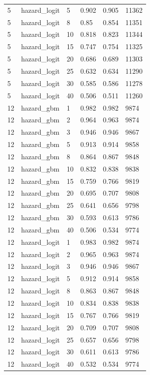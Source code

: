 \begin{tabular}{llllll}
5 & hazard\_logit & 5 & 0.902 & 0.905 & 11362 \\
5 & hazard\_logit & 8 & 0.85 & 0.854 & 11351 \\
5 & hazard\_logit & 10 & 0.818 & 0.823 & 11344 \\
5 & hazard\_logit & 15 & 0.747 & 0.754 & 11325 \\
5 & hazard\_logit & 20 & 0.686 & 0.689 & 11303 \\
5 & hazard\_logit & 25 & 0.632 & 0.634 & 11290 \\
5 & hazard\_logit & 30 & 0.585 & 0.586 & 11278 \\
5 & hazard\_logit & 40 & 0.506 & 0.511 & 11260 \\
12 & hazard\_gbm & 1 & 0.982 & 0.982 & 9874 \\
12 & hazard\_gbm & 2 & 0.964 & 0.963 & 9874 \\
12 & hazard\_gbm & 3 & 0.946 & 0.946 & 9867 \\
12 & hazard\_gbm & 5 & 0.913 & 0.914 & 9858 \\
12 & hazard\_gbm & 8 & 0.864 & 0.867 & 9848 \\
12 & hazard\_gbm & 10 & 0.832 & 0.838 & 9838 \\
12 & hazard\_gbm & 15 & 0.759 & 0.766 & 9819 \\
12 & hazard\_gbm & 20 & 0.695 & 0.707 & 9808 \\
12 & hazard\_gbm & 25 & 0.641 & 0.656 & 9798 \\
12 & hazard\_gbm & 30 & 0.593 & 0.613 & 9786 \\
12 & hazard\_gbm & 40 & 0.506 & 0.534 & 9774 \\
12 & hazard\_logit & 1 & 0.983 & 0.982 & 9874 \\
12 & hazard\_logit & 2 & 0.965 & 0.963 & 9874 \\
12 & hazard\_logit & 3 & 0.946 & 0.946 & 9867 \\
12 & hazard\_logit & 5 & 0.912 & 0.914 & 9858 \\
12 & hazard\_logit & 8 & 0.863 & 0.867 & 9848 \\
12 & hazard\_logit & 10 & 0.834 & 0.838 & 9838 \\
12 & hazard\_logit & 15 & 0.767 & 0.766 & 9819 \\
12 & hazard\_logit & 20 & 0.709 & 0.707 & 9808 \\
12 & hazard\_logit & 25 & 0.657 & 0.656 & 9798 \\
12 & hazard\_logit & 30 & 0.611 & 0.613 & 9786 \\
12 & hazard\_logit & 40 & 0.532 & 0.534 & 9774 \\
\bottomrule
\end{tabular}